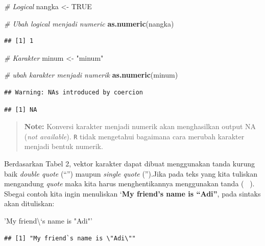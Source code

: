 \documentclass[]{book}
\newenvironment{Shaded}{\begin{snugshade}}{\end{snugshade}}
\newcommand{\KeywordTok}[1]{\textcolor[rgb]{0.13,0.29,0.53}{\textbf{#1}}}
\newcommand{\StringTok}[1]{\textcolor[rgb]{0.31,0.60,0.02}{#1}}
\newcommand{\CommentTok}[1]{\textcolor[rgb]{0.56,0.35,0.01}{\textit{#1}}}
\newcommand{\OtherTok}[1]{\textcolor[rgb]{0.56,0.35,0.01}{#1}}
\newcommand{\NormalTok}[1]{#1}
\begin{document}
\begin{Shaded}
\begin{Highlighting}[]
\CommentTok{# Logical}
\NormalTok{nangka <-}\StringTok{ }\OtherTok{TRUE}

\CommentTok{# Ubah logical menjadi numeric}
\KeywordTok{as.numeric}\NormalTok{(nangka)}
\end{Highlighting}
\end{Shaded}

\begin{verbatim}
## [1] 1
\end{verbatim}

\begin{Shaded}
\begin{Highlighting}[]
\CommentTok{# Karakter}
\NormalTok{minum <-}\StringTok{ "minum"}

\CommentTok{# ubah karakter menjadi numerik}
\KeywordTok{as.numeric}\NormalTok{(minum)}
\end{Highlighting}
\end{Shaded}

\begin{verbatim}
## Warning: NAs introduced by coercion
\end{verbatim}

\begin{verbatim}
## [1] NA
\end{verbatim}

\begin{quote}
\textbf{Note: } Konversi karakter menjadi numerik akan menghasilkan
output NA (\emph{not available}). \texttt{R} tidak mengetahui bagaimana
cara merubah karakter menjadi bentuk numerik.
\end{quote}

Berdasarkan Tabel 2, vektor karakter dapat dibuat menggunakan tanda
kurung baik \emph{double quote} (``'') maupun \emph{single quote}
('').Jika pada teks yang kita tuliskan mengandung \emph{quote} maka kita
harus menghentikannya menggunakan tanda ( ~). Sbegai contoh kita ingin
menuliskan `\textbf{My friend's name is ``Adi''}, pada sintaks akan
dituliskan:

\begin{Shaded}
\begin{Highlighting}[]
\StringTok{'My friend\textbackslash{}`s name is "Adi"'}
\end{Highlighting}
\end{Shaded}

\begin{verbatim}
## [1] "My friend`s name is \"Adi\""
\end{verbatim}
\end{document}

